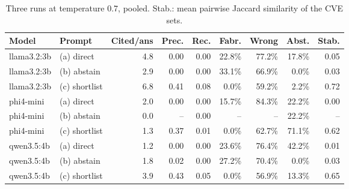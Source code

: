 \begin{table}[t]
\centering
\small
\caption{Three runs at temperature 0.7, pooled. Stab.: mean pairwise Jaccard similarity of the CVE sets.}
\label{tab:overall-t07}
\begin{tabular}{llrrrrrrr}
\toprule
Model & Prompt & Cited/ans & Prec. & Rec. & Fabr. & Wrong & Abst. & Stab. \\
\midrule
llama3.2:3b & (a) direct & 4.8 & 0.00 & 0.00 & 22.8\% & 77.2\% & 17.8\% & 0.05 \\
llama3.2:3b & (b) abstain & 2.9 & 0.00 & 0.00 & 33.1\% & 66.9\% & 0.0\% & 0.03 \\
llama3.2:3b & (c) shortlist & 6.8 & 0.41 & 0.08 & 0.0\% & 59.2\% & 2.2\% & 0.72 \\
\midrule
phi4-mini & (a) direct & 2.0 & 0.00 & 0.00 & 15.7\% & 84.3\% & 22.2\% & 0.00 \\
phi4-mini & (b) abstain & 0.0 & -- & 0.00 & -- & -- & 22.2\% & -- \\
phi4-mini & (c) shortlist & 1.3 & 0.37 & 0.01 & 0.0\% & 62.7\% & 71.1\% & 0.62 \\
\midrule
qwen3.5:4b & (a) direct & 1.2 & 0.00 & 0.00 & 23.6\% & 76.4\% & 42.2\% & 0.01 \\
qwen3.5:4b & (b) abstain & 1.8 & 0.02 & 0.00 & 27.2\% & 70.4\% & 0.0\% & 0.03 \\
qwen3.5:4b & (c) shortlist & 3.9 & 0.43 & 0.05 & 0.0\% & 56.9\% & 13.3\% & 0.65 \\
\bottomrule
\end{tabular}
\end{table}

